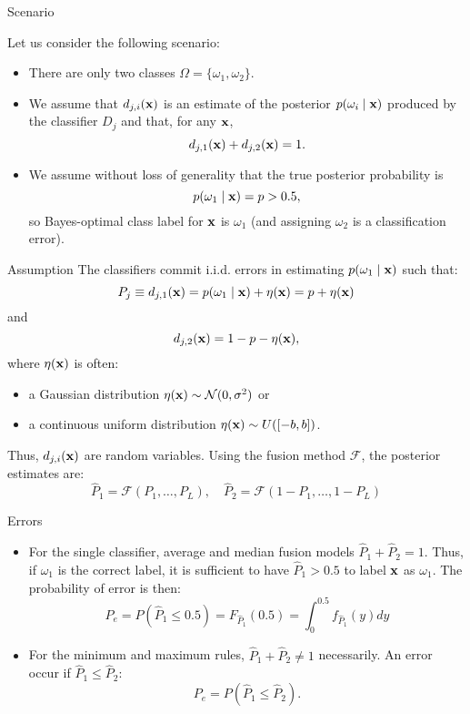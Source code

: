 \documentclass[xcolor=table]{beamer}
\begin{document}
\begin{frame}{Scenario}

Let us consider the following scenario:

\begin{itemize}
    \item There are only two classes \(\Omega = \{\omega_1, \omega_2\}\).
    \item We assume that \(d_{j,i}({\mathbf x})\) is an estimate of the posterior \(p(\omega_i\mid {\mathbf x})\) produced by the classifier \(D_j\) and that, for any \({\mathbf x}\),
    \[
    d_{j,1}({\mathbf x}) + d_{j,2}({\mathbf x}) = 1.
    \]
    \item We assume without loss of generality that the true posterior probability is
    \[
    p(\omega_1 \mid {\mathbf x}) = p > 0.5,
    \]
    so Bayes-optimal class label for \({\mathbf x}\) is \(\omega_1\) (and assigning \(\omega_2\) is a classification error).
\end{itemize}
\end{frame}


\begin{frame}{Assumption}
    The classifiers commit i.i.d. errors in estimating \(p(\omega_1 \mid {\mathbf x})\) such that:
    \[
    P_j \equiv d_{j,1}({\mathbf x}) = p(\omega_1\mid {\mathbf x}) + \eta({\mathbf x}) = p + \eta({\mathbf x})
    \]
    and
    \[
    d_{j,2}({\mathbf x}) = 1 - p - \eta({\mathbf x}),
    \]
    where \(\eta({\mathbf x})\) is often:
    \begin{itemize}
        \item a Gaussian distribution \(\eta({\mathbf x}) \sim \mathcal N (0,\sigma^2)\) or
        \item a continuous uniform distribution \(\eta({\mathbf x}) \sim U([-b,b])\).
    \end{itemize}

\pause
    Thus, \(d_{j,i}({\mathbf x})\) are random variables. Using the fusion method \(\mathcal F\), the posterior estimates are:
    \[
    \hat P_1 = \mathcal F \left(P_1,\dots, P_L\right), \quad \hat P_2 = \mathcal F \left(1-P_1,\dots, 1-P_L\right)
    \]
\end{frame}


\begin{frame}{Errors}
    \begin{itemize}
        \item For the single classifier, average and median fusion models \(\hat P_1 + \hat P_2 = 1\). Thus, if \(\omega_1\) is the correct label, it is sufficient to have \(\hat P_1 > 0.5\) to label \({\mathbf x}\) as \(\omega_1\). The probability of error is then:
        \[
        P_e = P(\hat P_1 \leq 0.5) = F_{\hat P_1}(0.5) = \int_0^{0.5}f_{\hat P_1}(y) dy
        \]
        \pause
        \item For the minimum and maximum rules, \(\hat P_1 + \hat P_2 \neq 1\) necessarily. An error occur if \(\hat P_1 \leq \hat P_2\):
        \[
        P_e = P(\hat P_1 \leq \hat P_2).
        \]
    \end{itemize}
\end{frame}
\end{document}
